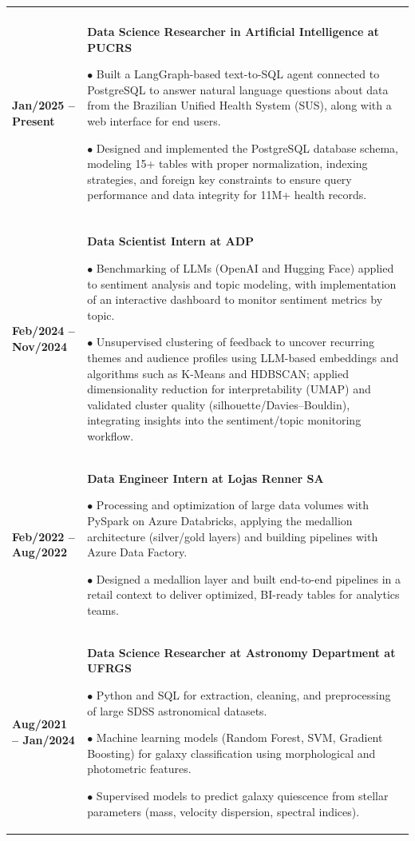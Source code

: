 \documentclass[a4paper,10pt]{article}
\begin{document}
\begin{longtable}{p{}|p{}}
\vspace{1.3pt}

\\[4pt]

\textbf{Jan/2025 -- Present} &
\textbf{\large Data Science Researcher in Artificial Intelligence at PUCRS} \par
$\bullet$ Built a LangGraph-based text-to-SQL agent connected to PostgreSQL to answer natural language questions about data from the Brazilian Unified Health System (SUS), along with a web interface for end users.

$\bullet$ Designed and implemented the PostgreSQL database schema, modeling 15+ tables with proper normalization, indexing strategies, and foreign key constraints to ensure query performance and data integrity for 11M+ health records.\\[2pt]


\\[4pt]

\textbf{Feb/2024 -- Nov/2024} &
\textbf{\large Data Scientist Intern at ADP} \par
$\bullet$ Benchmarking of LLMs (OpenAI and Hugging Face) applied to sentiment analysis and topic modeling, with implementation of an interactive dashboard to monitor sentiment metrics by topic.\par

$\bullet$ Unsupervised clustering of feedback to uncover recurring themes and audience profiles using LLM-based embeddings and algorithms such as K-Means and HDBSCAN; applied dimensionality reduction for interpretability (UMAP) and validated cluster quality (silhouette/Davies–Bouldin), integrating insights into the sentiment/topic monitoring workflow.


\\[4pt]

\textbf{Feb/2022 -- Aug/2022} &
\textbf{\large Data Engineer Intern at Lojas Renner SA} \par
$\bullet$ Processing and optimization of large data volumes with PySpark on Azure Databricks, applying the medallion architecture (silver/gold layers) and building pipelines with Azure Data Factory.

$\bullet$ Designed a medallion layer and built end-to-end pipelines in a retail context to deliver optimized, BI-ready tables for analytics teams.
\\[4pt]


\textbf{Aug/2021 -- Jan/2024} &
\textbf{\large Data Science Researcher at Astronomy Department at UFRGS} \par
$\bullet$ Python and SQL for extraction, cleaning, and preprocessing of large SDSS astronomical datasets.\par
$\bullet$ Machine learning models (Random Forest, SVM, Gradient Boosting) for galaxy classification using morphological and photometric features.\par
$\bullet$ Supervised models to predict galaxy quiescence from stellar parameters (mass, velocity dispersion, spectral indices).
\\

\end{longtable}
\end{document}
